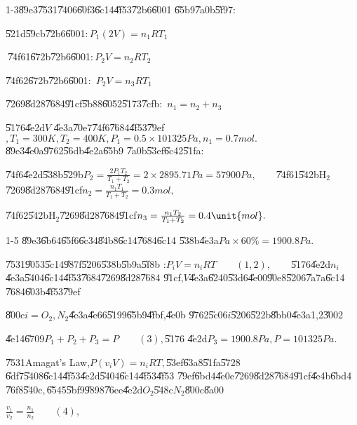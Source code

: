 \documentclass{article}
\begin{document}
1-3\U{89e3}\qquad \U{7531}\U{7406}\U{60f3}\U{6c14}\U{4f53}\U{72b6}\U{6001}%
\U{65b9}\U{7a0b}\U{5f97}$:$

\qquad \U{521d}\U{59cb}\U{72b6}\U{6001}$:P_{1}(2V)=n_{1}RT_{1}$

$\ $\U{74f6}1\U{672b}\U{72b6}\U{6001}$:P_{2}V=n_{2}RT_{2}$

\qquad \U{74f6}2\U{672b}\U{72b6}\U{6001}$:$ $P_{2}V=n_{3}RT_{1}$

\qquad \U{7269}\U{8d28}\U{7684}\U{91cf}\U{5b88}\U{6052}\U{5173}\U{7cfb}$:$ $%
n_{1}=n_{2}+n_{3}$

\U{5176}\U{4e2d}$V$ \U{4e3a}\U{70e7}\U{74f6}\U{7684}\U{4f53}\U{79ef}$%
,T_{1}=300\unit{K},T_{2}=400\unit{K},P_{1}=0.5\times 101325\unit{Pa}%
,n_{1}=0.7\unit{mol}.$\U{89e3}\U{4e0a}\U{9762}\U{56db}\U{4e2a}\U{65b9}%
\U{7a0b}\U{53ef}\U{6c42}\U{51fa}$:$

\U{74f6}\U{4e2d}\U{538b}\U{529b}$P_{2}=\frac{2P_{1}T_{2}}{T_{1}+T_{2}}%
=2\times 2895.71\unit{Pa}=57900\unit{Pa},\qquad $\U{74f6}1\U{542b}H$_{2}$%
\U{7269}\U{8d28}\U{7684}\U{91cf}$n_{2}=\frac{n_{1}T_{1}}{T_{1}+T_{2}}=0.3%
\unit{mol},$

\U{74f6}2\U{542b}H$_{2}$\U{7269}\U{8d28}\U{7684}\U{91cf}$n_{3}=\frac{%
n_{1}T_{2}}{T_{1}+T_{2}}=0.4\unit{mol}.$

1-5 \U{89e3}\qquad \U{6b64}\U{65f6}\U{6c34}\U{84b8}\U{6c14}\U{7684}\U{6c14}%
\U{538b}\U{4e3a}$\unit{Pa}\times 60\%=1900.8\unit{Pa}.$

\qquad \U{7531}\U{9053}\U{5c14}\U{987f}\U{5206}\U{538b}\U{5b9a}\U{5f8b}%
:\qquad $P_{i}V=n_{i}RT\qquad \left( 1,2\right) ,\qquad $\U{5176}\U{4e2d}$%
n_{i}$\U{4e3a}\U{5404}\U{6c14}\U{4f53}\U{7684}\U{7269}\U{8d28}\U{7684}%
\U{91cf},$V$\U{4e3a}\U{6240}\U{53d6}\U{4e00}\U{90e8}\U{5206}\U{7a7a}\U{6c14}%
\U{7684}\U{603b}\U{4f53}\U{79ef}

\U{800c}$i=O_{2},N_{2}$\U{4e3a}\U{4e66}\U{5199}\U{65b9}\U{4fbf},\U{4e0b}%
\U{9762}\U{5c06}$i$\U{5206}\U{522b}\U{8bb0}\U{4e3a}1,2\U{3002}

\U{4e14}\U{6709}\qquad $P_{1}+P_{2}+P_{3}=P\qquad \left( 3\right) ,$\U{5176}%
\U{4e2d}\qquad $P_{3}=1900.8\unit{Pa},P=101325Pa.$

\U{7531}Amagat's Law,$P(v_{i}V)=n_{i}RT,$\U{53ef}\U{63a8}\U{51fa}\U{5728}%
\U{6df7}\U{5408}\U{6c14}\U{4f53}\U{4e2d}\U{5404}\U{6c14}\U{4f53}\U{4f53}%
\U{79ef}\U{6bd4}\U{4e0e}\U{7269}\U{8d28}\U{7684}\U{91cf}\U{4e4b}\U{6bd4}%
\U{76f8}\U{540c}$,$\U{6545}\U{5bf9}\U{9898}\U{76ee}\U{4e2d}$O_{2}$\U{548c}$%
N_{2}$\U{800c}\U{8a00}

$\frac{v_{1}}{v_{2}}=\frac{n_{1}}{n_{2}}\qquad \left( 4\right) ,$
\end{document}
